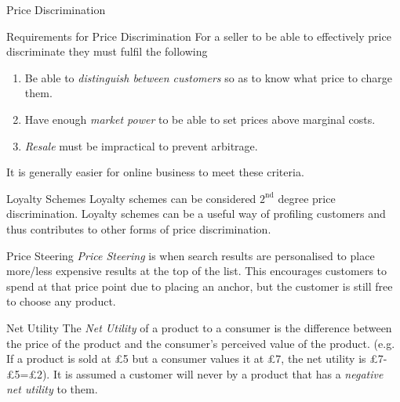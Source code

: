 \documentclass[11pt,a4paper]{article}
\begin{document}
\begin{definition}{Price Discrimination}
  \end{definition}

  \begin{proposition}{Requirements for Price Discrimination}
    For a seller to be able to effectively price discriminate they must fulfil the following
    \begin{enumerate}
      \item Be able to \textit{distinguish between customers} so as to know what price to charge them.
      \item Have enough \textit{market power} to be able to set prices above marginal costs.
      \item \textit{Resale} must be impractical to prevent arbitrage.
    \end{enumerate}
    It is generally easier for online business to meet these criteria.
  \end{proposition}

  \begin{remark}{Loyalty Schemes}
    Loyalty schemes can be considered $2^\text{nd}$ degree price discrimination. Loyalty schemes can be a useful way of profiling customers and thus contributes to other forms of price discrimination.
  \end{remark}

  \begin{definition}{Price Steering}
    \textit{Price Steering} is when search results are personalised to place more/less expensive results at the top of the list. This encourages customers to spend at that price point due to placing an anchor, but the customer is still free to choose any product.
  \end{definition}

  \begin{definition}{Net Utility}
    The \textit{Net Utility} of a product to a consumer is the difference between the price of the product and the consumer's perceived value of the product. (e.g. If a product is sold at £5 but a consumer values it at £7, the net utility is £7-£5=£2). It is assumed a customer will never by a product that has a \textit{negative net utility} to them.
  \end{definition}
\end{document}
